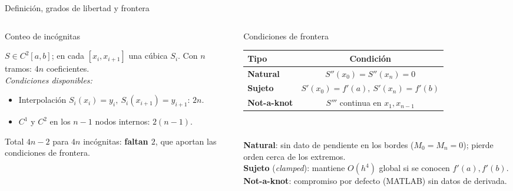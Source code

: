 \documentclass[aspectratio=169,10pt]{beamer}
\begin{document}
\begin{frame}{Definición, grados de libertad y frontera}
\begin{columns}[T]
\begin{column}{0.49\textwidth}
\begin{cardidea}{Conteo de incógnitas}{\faSuperscript}
{\footnotesize $S\in C^2[a,b]$; en cada $[x_i,x_{i+1}]$ una cúbica $S_i$. Con $n$ tramos: $4n$ coeficientes.\\[1.0mm]
\emph{Condiciones disponibles:}
\begin{itemize}\setlength{\itemsep}{0.3mm}
\item Interpolación $S_i(x_i)=y_i,\ S_i(x_{i+1})=y_{i+1}$: $2n$.
\item $C^1$ y $C^2$ en los $n{-}1$ nodos internos: $2(n{-}1)$.
\end{itemize}
Total $4n-2$ para $4n$ incógnitas: \textbf{faltan $2$}, que aportan las condiciones de frontera.}
\end{cardidea}
\end{column}
\begin{column}{0.49\textwidth}
\begin{cardgear}{Condiciones de frontera}{\faTable}
\centering
{\footnotesize\renewcommand{\arraystretch}{1.3}\setlength{\tabcolsep}{4pt}
\begin{tabular}{l|c}
Tipo & Condición\\\hline
\textbf{Natural} & $S''(x_0)=S''(x_n)=0$\\
\textbf{Sujeto} & $S'(x_0)=f'(a),\ S'(x_n)=f'(b)$\\
\textbf{Not-a-knot} & $S'''$ continua en $x_1,x_{n-1}$\\
\end{tabular}}\\[1.4mm]
\raggedright
{\footnotesize \textbf{Natural}: sin dato de pendiente en los bordes ($M_0{=}M_n{=}0$); pierde orden cerca de los extremos.\\[0.6mm]
\textbf{Sujeto} (\emph{clamped}): mantiene $O(h^4)$ global si se conocen $f'(a),f'(b)$.\\[0.6mm]
\textbf{Not-a-knot}: compromiso por defecto (MATLAB) sin datos de derivada.}
\end{cardgear}
\end{column}
\end{columns}
\end{frame}
\end{document}
